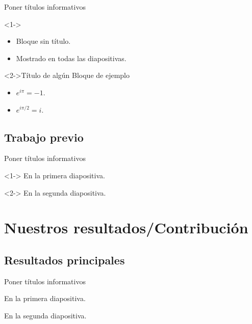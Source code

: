 \documentclass[]{beamer}
\theoremstyle{plain}
\begin{document}
\begin{frame}{Poner títulos informativos}

\begin{block}<1->{}

\begin{itemize}
\item Bloque sin título.
\item Mostrado en todas las diapositivas.
\end{itemize}
\end{block}
\begin{exampleblock}<2->{Título de algún Bloque de ejemplo}

\begin{itemize}
\item $e^{i\pi}=-1$.
\item $e^{i\pi/2}=i$.
\end{itemize}
\end{exampleblock}
\end{frame}

\subsection{Trabajo previo}
\begin{frame}{Poner títulos informativos}



\begin{example}<1->
En la primera diapositiva.
\end{example}



\begin{example}<2->
En la segunda diapositiva.
\end{example}

\end{frame}

\section{Nuestros resultados/Contribución}


\subsection{Resultados principales}
\begin{frame}{Poner títulos informativos}

\begin{theorem}
En la primera diapositiva.
\end{theorem}


\pause{}
\begin{corollary}
En la segunda diapositiva.
\end{corollary}

\end{frame}
\end{document}
